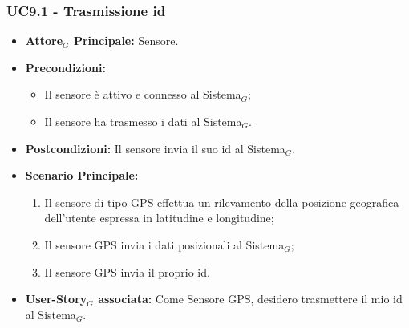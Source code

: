 \documentclass[10pt]{article}
\begin{document}
\begin{justify}
\subsubsection{\textbf{UC9.1 - Trasmissione id}}
\begin{itemize}
    \item \textbf{Attore$_G$ Principale:} Sensore.
    \item \textbf{Precondizioni:} 
        \begin{itemize}
    	\item Il sensore è attivo e connesso al Sistema$_G$;
          \item Il sensore ha trasmesso i dati al Sistema$_G$.
        \end{itemize}
    \item \textbf{Postcondizioni:} Il sensore invia il suo id al Sistema$_G$.
    \item \textbf{Scenario Principale:} 
        \begin{enumerate}
            \item Il sensore di tipo GPS effettua un rilevamento della posizione geografica dell'utente espressa in latitudine e longitudine;
            \item Il sensore GPS invia i dati posizionali al Sistema$_G$;
            \item Il sensore GPS invia il proprio id.
        \end{enumerate}
    \item \textbf{User-Story$_G$ associata:} Come Sensore GPS, desidero trasmettere il mio id al Sistema$_G$.
\end{itemize}

\end{justify}
\end{document}
